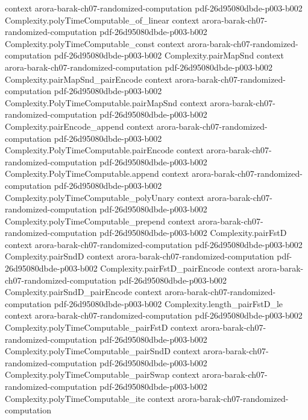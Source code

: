 \begin{theorem}
  {context}
  {arora-barak-ch07-randomized-computation}
  {pdf-26d95080dbde-p003-b002}
\proofstep
  {Complexity.polyTimeComputable_of_linear}
  {context}
  {arora-barak-ch07-randomized-computation}
  {pdf-26d95080dbde-p003-b002}
\proofstep
  {Complexity.polyTimeComputable_const}
  {context}
  {arora-barak-ch07-randomized-computation}
  {pdf-26d95080dbde-p003-b002}
\proofstep
  {Complexity.pairMapSnd}
  {context}
  {arora-barak-ch07-randomized-computation}
  {pdf-26d95080dbde-p003-b002}
\proofstep
  {Complexity.pairMapSnd_pairEncode}
  {context}
  {arora-barak-ch07-randomized-computation}
  {pdf-26d95080dbde-p003-b002}
\proofstep
  {Complexity.PolyTimeComputable.pairMapSnd}
  {context}
  {arora-barak-ch07-randomized-computation}
  {pdf-26d95080dbde-p003-b002}
\proofstep
  {Complexity.pairEncode_append}
  {context}
  {arora-barak-ch07-randomized-computation}
  {pdf-26d95080dbde-p003-b002}
\proofstep
  {Complexity.PolyTimeComputable.pairEncode}
  {context}
  {arora-barak-ch07-randomized-computation}
  {pdf-26d95080dbde-p003-b002}
\proofstep
  {Complexity.PolyTimeComputable.append}
  {context}
  {arora-barak-ch07-randomized-computation}
  {pdf-26d95080dbde-p003-b002}
\proofstep
  {Complexity.polyTimeComputable_polyUnary}
  {context}
  {arora-barak-ch07-randomized-computation}
  {pdf-26d95080dbde-p003-b002}
\proofstep
  {Complexity.polyTimeComputable_prepend}
  {context}
  {arora-barak-ch07-randomized-computation}
  {pdf-26d95080dbde-p003-b002}
\proofstep
  {Complexity.pairFstD}
  {context}
  {arora-barak-ch07-randomized-computation}
  {pdf-26d95080dbde-p003-b002}
\proofstep
  {Complexity.pairSndD}
  {context}
  {arora-barak-ch07-randomized-computation}
  {pdf-26d95080dbde-p003-b002}
\proofstep
  {Complexity.pairFstD_pairEncode}
  {context}
  {arora-barak-ch07-randomized-computation}
  {pdf-26d95080dbde-p003-b002}
\proofstep
  {Complexity.pairSndD_pairEncode}
  {context}
  {arora-barak-ch07-randomized-computation}
  {pdf-26d95080dbde-p003-b002}
\proofstep
  {Complexity.length_pairFstD_le}
  {context}
  {arora-barak-ch07-randomized-computation}
  {pdf-26d95080dbde-p003-b002}
\proofstep
  {Complexity.polyTimeComputable_pairFstD}
  {context}
  {arora-barak-ch07-randomized-computation}
  {pdf-26d95080dbde-p003-b002}
\proofstep
  {Complexity.polyTimeComputable_pairSndD}
  {context}
  {arora-barak-ch07-randomized-computation}
  {pdf-26d95080dbde-p003-b002}
\proofstep
  {Complexity.polyTimeComputable_pairSwap}
  {context}
  {arora-barak-ch07-randomized-computation}
  {pdf-26d95080dbde-p003-b002}
\proofstep
  {Complexity.polyTimeComputable_ite}
  {context}
  {arora-barak-ch07-randomized-computation}

\end{theorem}
